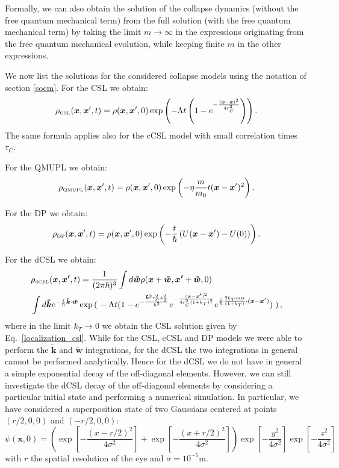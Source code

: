 \documentclass[12pt,groupedaddress,pra,aps]{revtex4-1}
\begin{document}
Formally, we can also obtain the solution of the collapse dynamics (without the free quantum mechanical term)  from the full solution (with the free quantum mechanical term) by taking the limit  $m \rightarrow \infty$ in the expressions originating from the free quantum mechanical evolution, while keeping finite $m$ in the other expressions. 

We now list the solutions for the considered collapse models using the notation of  section \ref{socm}. For the CSL we obtain:
\begin{equation}\label{localization_csl}
\rho_{\text{\tiny CSL}}(\bm{x},\bm{x}',t)=\rho(\bm{x},\bm{x}',0) \exp \left(-\Lambda t \left(1-e^{-\frac{(\bm{x}-\bm{x})^2}{4r_C^2}}\right) \right).
\end{equation} 
The same formula applies also for the cCSL model with small correlation times $\tau_C$.

For the QMUPL we obtain:
\begin{equation}
\rho_{\text{\tiny QMUPL}}(\bm{x},\bm{x}',t)=\rho(\bm{x},\bm{x}',0)\exp\left(-\eta\frac{m}{m_{0}}t(\bm{x}-\bm{x}')^{2}\right).\label{eq:solution2}
\end{equation}


For the DP we obtain:
\begin{equation}
\rho_{\text{\tiny DP}}(\bm{x},\bm{x}',t)=\rho(\bm{x},\bm{x}',0) \exp 
\left(-\frac{t}{\hbar} \left(U(\bm{x}-\bm{x}')-U(0)\right) \right).
\end{equation} 

For the dCSL we obtain:
\begin{equation}\label{rho_grw_dp3_localization}
\begin{split}
&\rho_{\text{\tiny dCSL}}(\bm{x},\bm{x'},t)= \frac{1}{(2\pi\hbar)^3}\int d\bm{\tilde{w}} \rho(\bm{x}+\bm{\tilde{w}},\bm{x'}+\bm{\tilde{w}},0)  \\
& \int d\bm{\tilde{k}} e^{-\frac{i}{\hbar}\bm{\tilde{k}} \cdot \bm{\tilde{w}}} \exp \left(\right.-\Lambda t(1- e^{-\frac{\bm{\tilde{k}}^2 r_C^2 k_T^2}{\hbar^2}}
 e^{-\frac{(\bm{x}-\bm{x'})^2}{4r_C^2 (1+k_T)^2}}  e^{\frac{i}{\hbar}\frac{2 k_T m \bm{u}}{(1+k_T)} \cdot (\bm{x}-\bm{x}')} ) \left.\right),
\end{split}
\end{equation}
where in the limit $k_T \rightarrow 0$ we obtain the CSL solution given by Eq.~\eqref{localization_csl}. While for the CSL, cCSL and DP models we were able to perform the $\bm{\tilde{k}}$ and $\bm{\tilde{w}}$ integrations, for the dCSL the two integrations in general cannot be performed analytically. Hence for the dCSL we do not have in general a simple exponential decay of the off-diagonal elements. However, we can still investigate the dCSL decay of the off-diagonal elements by considering a particular initial state and performing a numerical simulation. In particular, we have considered a superposition state of two Gaussians centered at points $(r/2,0,0)$ and  $(-r/2,0,0)$:
\begin{equation}
\psi(\bm{x},0)= \left(\exp[-\frac{(x-r/2)^2}{4\sigma^2}]+\exp[-\frac{(x+r/2)^2}{4\sigma^2}]\right)\exp[-\frac{y^2}{4\sigma^2}]\exp[-\frac{z^2}{4\sigma^2}]
\end{equation}
with $r$ the spatial resolution of the eye and $\sigma=10^{-5}\text{m}$.
\end{document}
